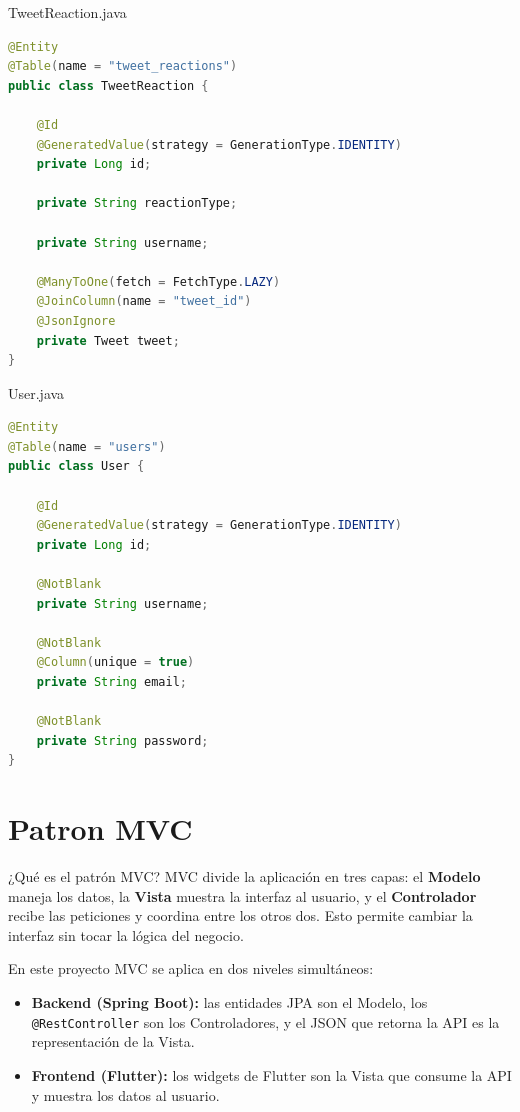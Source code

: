 \documentclass[12pt,a4paper]{article}
\begin{document}
\begin{filebox}{TweetReaction.java}
\begin{lstlisting}[language=Java]
@Entity
@Table(name = "tweet_reactions")
public class TweetReaction {

    @Id
    @GeneratedValue(strategy = GenerationType.IDENTITY)
    private Long id;

    private String reactionType;

    private String username;

    @ManyToOne(fetch = FetchType.LAZY)
    @JoinColumn(name = "tweet_id")
    @JsonIgnore
    private Tweet tweet;
}
\end{lstlisting}
\end{filebox}

\begin{filebox}{User.java}
\begin{lstlisting}[language=Java]
@Entity
@Table(name = "users")
public class User {

    @Id
    @GeneratedValue(strategy = GenerationType.IDENTITY)
    private Long id;

    @NotBlank
    private String username;

    @NotBlank
    @Column(unique = true)
    private String email;

    @NotBlank
    private String password;
}
\end{lstlisting}
\end{filebox}

\section{Patron MVC}

\begin{patternbox}{¿Qué es el patrón MVC?}
MVC divide la aplicación en tres capas: el \textbf{Modelo} maneja
los datos, la \textbf{Vista} muestra la interfaz al usuario, y el
\textbf{Controlador} recibe las peticiones y coordina entre los otros
dos. Esto permite cambiar la interfaz sin tocar la lógica del negocio.
\end{patternbox}

En este proyecto MVC se aplica en dos niveles simultáneos:

\begin{itemize}
  \item \textbf{Backend (Spring Boot):} las entidades JPA son el Modelo,
        los \texttt{@RestController} son los Controladores, y el JSON
        que retorna la API es la representación de la Vista.
  \item \textbf{Frontend (Flutter):} los widgets de Flutter son la Vista
        que consume la API y muestra los datos al usuario.
\end{itemize}
\end{document}
